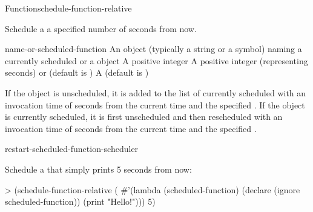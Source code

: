 \begin{functiondoc}{Function}{schedule-function-relative}%
  { 
     }
%
%
%

\fnsyntax

\fnpurpose Schedule a  a specified number of
seconds from now.

\fnpackage {}

\fnmodule {}

\fnargs
\begin{args}{name-or-scheduled-function}
 An object (typically a string or a
  symbol) naming a currently scheduled  or a
   object
\arg[seconds] A positive integer
 A positive integer (representing seconds) or
  \nil{} (default is \nil)
\arg[verbose] A 
  (default is \textbf{})
\end{args}

\fnerrors
\nothreads{}

\fndescription If the  object is unscheduled, it is
added to the list of currently scheduled  with an
invocation time of  seconds from the current time and the
specified .  If the  object is
currently scheduled, it is first unscheduled and then rescheduled with an
invocation time of  seconds from the current time and the
specified .

\begin{alsos}{restart-scheduled-function-scheduler}
\end{alsos}

%
\fnexamples
Schedule a  that simply prints  
5 seconds from now:
\begin{example}
> (schedule-function-relative
    (
      #'(lambda (scheduled-function)
          (declare (ignore scheduled-function))
          (print "Hello!")))
     5)
\end{example}


\end{functiondoc}
